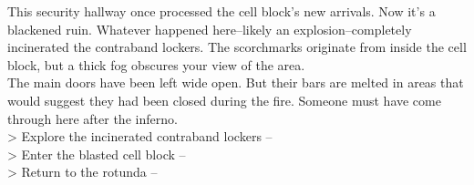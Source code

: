 This security hallway once processed the cell block’s new arrivals. Now it’s a blackened ruin. Whatever happened here--likely an explosion--completely incinerated the contraband lockers. The scorchmarks originate from inside the cell block, but a thick fog obscures your view of the area.\\

The main doors have been left wide open. But their bars are melted in areas that would suggest they had been closed during the fire. Someone must have come through here after the inferno.\\

> Explore the incinerated contraband lockers -- \\
> Enter the blasted cell block -- \\
> Return to the rotunda -- 